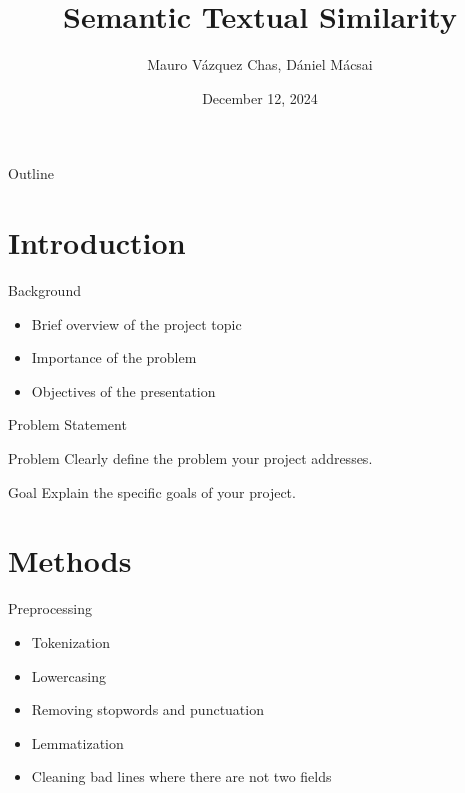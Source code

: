 \documentclass{beamer}
\title[Semantic Textual Similarity]{Semantic Textual Similarity}}
\author{Mauro Vázquez Chas, Dániel Mácsai}
\date{December 12, 2024}
\begin{document}
\begin{frame}
    \titlepage
\end{frame}

\begin{frame}{Outline}
    \tableofcontents
\end{frame}

\section{Introduction}

\begin{frame}{Background}
    \begin{itemize}
        \item Brief overview of the project topic
        \item Importance of the problem
        \item Objectives of the presentation
    \end{itemize}
\end{frame}

\begin{frame}{Problem Statement}
    \begin{block}{Problem}
        Clearly define the problem your project addresses.
    \end{block}
    \begin{block}{Goal}
        Explain the specific goals of your project.
    \end{block}
\end{frame}

\section{Methods}

\begin{frame}{Preprocessing}
    \begin{itemize}
        \item Tokenization
        \item Lowercasing
        \item Removing stopwords and punctuation
        \item Lemmatization
    \end{itemize}

    \begin{itemize}
        \item Cleaning bad lines where there are not two fields
    \end{itemize}
\end{frame}
\end{document}
